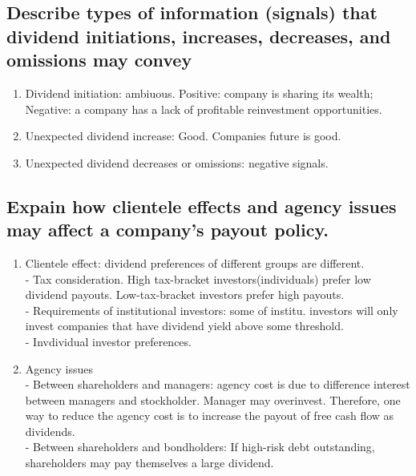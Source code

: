 \documentclass{article}
\newcommand{\be}{\begin{enumerate}}
\newcommand{\ee}{\end{enumerate}}
\begin{document}
\subsection{Describe types of information (signals) that dividend initiations, increases, 
decreases, and omissions may convey}
\be
    \item Dividend initiation: ambiuous. Positive: company is sharing its wealth; Negative: 
        a company has a lack of profitable reinvestment opportunities.
    \item Unexpected dividend increase: Good.  Companies future is good.
    \item Unexpected dividend decreases or omissions: negative signals.
\ee 
\subsection{Expain how clientele effects and agency issues may affect a company's payout
policy.}
\be
    \item Clientele effect: dividend preferences of different groups are different.
        \\- Tax consideration. High tax-bracket investors(individuals) prefer low dividend
        payouts. Low-tax-bracket investors prefer high payouts.
        \\- Requirements of institutional investors: some of institu. investors
        will only invest companies that have dividend yield above some threshold.
        \\- Invdividual investor preferences.
    \item Agency issues
        \\- Between shareholders and managers: agency cost is due to difference interest
        between managers and stockholder. Manager may overinvest. Therefore, one way to reduce
        the agency cost is to increase the payout of free cash flow as dividends.
        \\- Between shareholders and bondholders: If high-risk debt outstanding, shareholders may pay
        themselves a large dividend.
\ee
\end{document}
